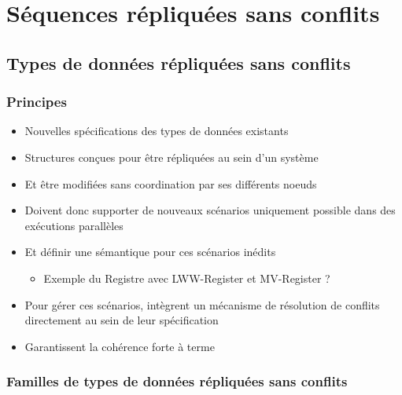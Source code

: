 \documentclass[12pt]{thesul}
\begin{document}


\section{Séquences répliquées sans conflits}
\subsection{Types de données répliquées sans conflits}
\subsubsection{Principes}

\begin{itemize}
  \item Nouvelles spécifications des types de données existants
  \item Structures conçues pour être répliquées au sein d'un système
  \item Et être modifiées sans coordination par ses différents noeuds
  \item Doivent donc supporter de nouveaux scénarios uniquement possible dans des exécutions parallèles
  \item Et définir une sémantique pour ces scénarios inédits
  \begin{itemize}
    \item Exemple du Registre avec LWW-Register et MV-Register ?
  \end{itemize}
  \item Pour gérer ces scénarios, intègrent un mécanisme de résolution de conflits directement au sein de leur spécification
  \item Garantissent la cohérence forte à terme
\end{itemize}


\subsubsection{Familles de types de données répliquées sans conflits}
\end{document}
